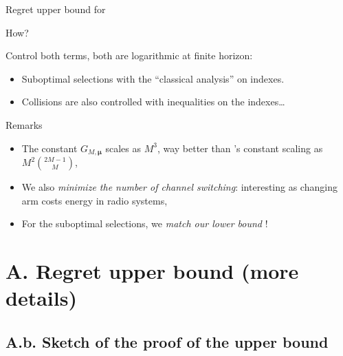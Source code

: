 \documentclass[12pt,english,ignorenonframetext,aspectratio=169,]{beamer}
\providecommand{\tightlist}{%
  \setlength{\itemsep}{0pt}\setlength{\parskip}{0pt}}
\begin{document}
\begin{frame}{Regret upper bound for \MCTopM{}}

\begin{block}{How?}

Control both terms, both are logarithmic at finite horizon:

\begin{itemize}\tightlist
\item
  Suboptimal selections with the ``classical analysis'' on \klUCB{}
  indexes.
\item
  Collisions are also controlled with inequalities on the \klUCB{} indexes\ldots{}
\end{itemize}

\end{block}

\pause

\begin{block}{Remarks}

\begin{itemize}\tightlist
\item
  The constant \(G_{M,\boldsymbol{\mu}}\) scales as \(M^3\), way better
  than \rhoRand's constant scaling as \(M^2 {2M-1 \choose M}\),
\item
  We also \emph{minimize the number of channel switching}: interesting
  as changing arm costs energy in radio systems,
\item
  For the suboptimal selections, we \emph{match our lower bound} !
\end{itemize}

\end{block}

\end{frame}\section{\hfill{}A. Regret upper bound (more details)\hfill{}}

\subsection{\hfill{}A.b. Sketch of the proof of the upper bound\hfill{}}
\end{document}
